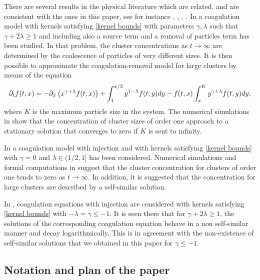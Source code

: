 \documentclass[11pt]{article}
\numberwithin{equation}{section}
\theoremstyle{plain}
\newcommand{\der}{\textup{d}}
\begin{document}
There are several results in the physical literature which are related, and are consistent with the ones in this paper, see for instance \cite{BC12}, \cite{KC12}, \cite{KMR98}, \cite{KMR99}. 
In \cite{BC12} a coagulation model with kernels satisfying \eqref{kernel bounds} with parameters $\gamma , \lambda $ such that $\gamma + 2 \lambda \geq 1 $ and including also a source term and a removal of particles term has been studied. In that problem, the cluster concentrations as $t \rightarrow \infty $ are determined by the coalescence of particles of very different sizes.
It is then possible to approximate the coagulation-removal model for large clusters by means of the equation
\[
\partial_t f(t, x)= - \partial_x \left( x^{\gamma + \lambda} f(t, x) \right) +\int_1^{x/2 } y^{1-\lambda} f(t, y ) \der y - f(t,x) \int_x^K y^{\gamma + \lambda} f(t, y) \der y,
\]
where $K$ is the maximum particle size in the system. 
The numerical simulations in \cite{BC12} show that the concentration of cluster sizes of order one approach to a stationary solution that converges to zero if $K$ is sent to infinity.


In \cite{KC12} a coagulation model with injection and with kernels satisfying \eqref{kernel bounds} with $\gamma =0$ and $\lambda \in (1/2, 1] $ has been considered. Numerical simulations and formal computations in \cite{KC12} suggest that the cluster concentration for clusters of order one tends to zero as $t \rightarrow \infty$. 
In addition, it is suggested that the concentration for large clusters are described by a  self-similar solution. 

In \cite{KMR98}, \cite{KMR99} coagulation equations with injection are considered with kernels satisfying \eqref{kernel bounds} with  $-\lambda =\gamma \leq -1 $. It is seen there that for $\gamma + 2 \lambda \geq 1 $, the solutions of the corresponding coagulation equation behave in a non self-similar manner and decay logarithmically. This is in agreement with the non-existence of self-similar solutions that we obtained in this paper for $\gamma \leq -1$.

\subsection{Notation and plan of the paper}
\end{document}
